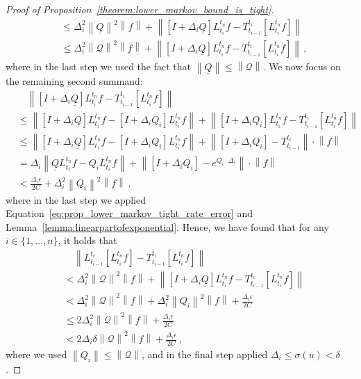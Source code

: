 \documentclass[10pt]{paper}
\theoremstyle{definition}
\newcommand{\rateset}{\mathcal{Q}}
\newcommand{\lrate}{\underline{Q}}
\newcommand{\norm}[1]{\left\lVert #1 \right\rVert}
\begin{document}
\begin{proof}[Proof of Proposition~\ref{theorem:lower_markov_bound_is_tight}]
\begin{align*}
&\leq \Delta_i^2\norm{\lrate}^2\norm{f} + \norm{\left[I+\Delta_i\lrate\right]L_{t_i}^{t_n}f - T_{t_{i-1}}^{t_i}\left[L_{t_i}^{t_n}f\right]} \\
&\leq \Delta_i^2\norm{\mathcal{Q}}^2\norm{f} + \norm{\left[I+\Delta_i\lrate\right]L_{t_i}^{t_n}f - T_{t_{i-1}}^{t_i}\left[L_{t_i}^{t_n}f\right]}\,,
\end{align*}
where in the last step we used the fact that $\norm{\lrate}\leq\norm{\rateset}$. We now focus on the remaining second summand:
\begin{align*}
 &\quad \norm{\left[I+\Delta_i\lrate\right]L_{t_i}^{t_n}f - T_{t_{i-1}}^{t_i}\left[L_{t_i}^{t_n}f\right]} \\
 &\leq \norm{\left[I+\Delta_i\lrate\right]L_{t_i}^{t_n}f - \left[I+\Delta_iQ_i\right]L_{t_i}^{t_n}f} + \norm{\left[I+\Delta_iQ_i\right]L_{t_i}^{t_n}f - T_{t_{i-1}}^{t_i}\left[L_{t_i}^{t_n}f\right]} \\
 &\leq \norm{\left[I+\Delta_i\lrate\right]L_{t_i}^{t_n}f - \left[I+\Delta_iQ_i\right]L_{t_i}^{t_n}f} + \norm{\left[I+\Delta_iQ_i\right] - T_{t_{i-1}}^{t_i}}\cdot\norm{f} \\
 &= \Delta_i\norm{\lrate L_{t_i}^{t_n}f - Q_iL_{t_i}^{t_n}f} + \norm{\left[I+\Delta_iQ_i\right] - e^{Q_i\cdot\Delta_i}}\cdot\norm{f} \\
 &< \frac{\Delta_i\epsilon}{2C} + \Delta_i^2\norm{Q_i}^2\norm{f}\,,
\end{align*}
where in the last step we applied Equation~\eqref{eq:prop_lower_markov_tight_rate_error} and Lemma~\ref{lemma:linearpartofexponential}. Hence, we have found that for any $i\in\{1,\ldots,n\}$, it holds that
\begin{align*}
&\quad \norm{L_{t_{i-1}}^{t_i}\left[L_{t_i}^{t_n}f\right] - T_{t_{i-1}}^{t_i}\left[L_{t_i}^{t_n}f\right]} \\
 &< \Delta_i^2\norm{\mathcal{Q}}^2\norm{f} + \norm{\left[I+\Delta_i\lrate\right]L_{t_i}^{t_n}f - T_{t_{i-1}}^{t_i}\left[L_{t_i}^{t_n}f\right]} \\
 &< \Delta_i^2\norm{\mathcal{Q}}^2\norm{f} + \Delta_i^2\norm{Q_i}^2\norm{f} + \frac{\Delta_i\epsilon}{2C} \\
 &\leq 2\Delta_i^2\norm{\mathcal{Q}}^2\norm{f} + \frac{\Delta_i\epsilon}{2C} \\
 &< 2\Delta_i\delta\norm{\mathcal{Q}}^2\norm{f} + \frac{\Delta_i\epsilon}{2C}\,,
\end{align*}
where we used $\norm{Q_i}\leq\norm{\rateset}$, and in the final step applied $\Delta_i\leq\sigma(u)<\delta$.


\end{proof}
\end{document}
